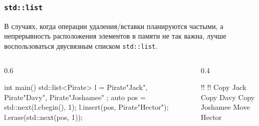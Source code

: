 \documentclass[compress, 8pt]{beamer}
\begin{document}
  \begin{frame}[fragile]

    \frametitle{\texttt{std::list}}

    В случаях, когда операции удаления/вставки планируются частыми,
    а непрерывность расположения элементов в памяти не так важна,
    лучше воспользоваться двусвязным списком \texttt{std::list}\footnotemark{}.


    \begin{columns}[T]

      \begin{column}{0.6\textwidth}

        \begin{mycppinplacelisting}
int main() {
    std::list<Pirate> l = {
        Pirate{"Jack"},
        Pirate{"Davy"},
        Pirate{"Joshamee"}
    };
    auto pos =
      std::next(l.cbegin(), 1);
    l.insert(pos, Pirate{"Hector"});
    l.erase(std::next(pos, 1));
}
        \end{mycppinplacelisting}

      \end{column}

      \begin{column}{0.4\textwidth}

        \begin{terminalwindow}
!!
!!
Copy Jack
Copy Davy
Copy Joshamee
Move Hector
        \end{terminalwindow}

      \end{column}

    \end{columns}

  \end{frame}
\end{document}
